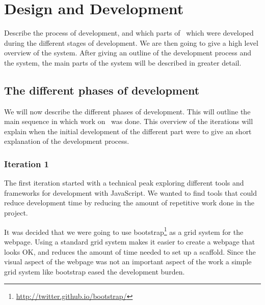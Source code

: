 
\chapter{Design and Development} %

\label{DesignAndDevelopment} %



Describe the process of development,
and which parts of \theartefact\ which were developed during the different stages of development.
We are then going to give a high level overview of the system.
After giving an outline of the development process and the system,
the main parts of the system will be described in greater detail.

\section{The different phases of development}
We will now describe the different phases of development.
This will outline the main sequence in which work on \theartefact\ was done.
This overview of the iterations will explain when the initial development of
the different part were to give an short explanation of the development process.

\subsection{Iteration 1}
The first iteration started with a technical peak exploring different tools and frameworks for development with JavaScript.
We wanted to find tools that could reduce development time by reducing the amount of repetitive work done in the project.

It was decided that we were going to use bootstrap\footnote{\url{http://twitter.github.io/bootstrap/}} as a grid system
for the webpage.
Using a standard grid system makes it easier to create a webpage that looks OK,
and reduces the amount of time needed to set up a scaffold.
Since the visual aspect of the webpage was not an important aspect of the work a simple grid system like bootstrap
eased the development burden.

